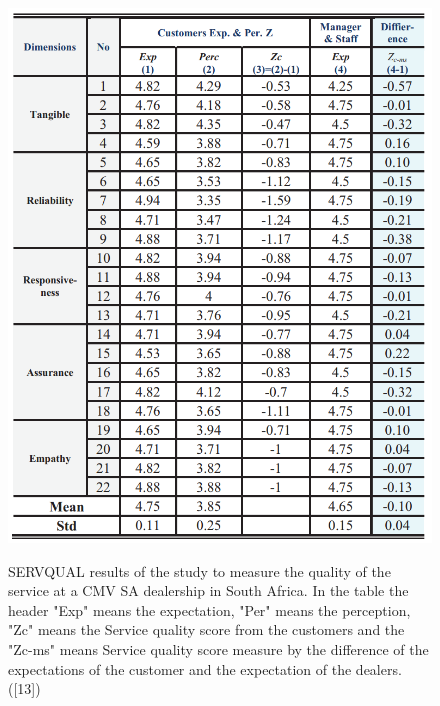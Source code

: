\begin{figure}[h]
  \caption{SERVQUAL results of the study to measure the quality of the service at a CMV SA dealership in South Africa. In the table the header "Exp" means the expectation, "Per" means the perception, "Zc" means the Service quality score from the customers and the "Zc-ms" means Service quality score measure by the difference of the expectations of the customer and the expectation of the dealers. ([13])}
  \centering
  \includegraphics[width=\textwidth]{figs/SERVQUAL_results}
  \label{fig:SERVQUAL_results}
\end{figure}

